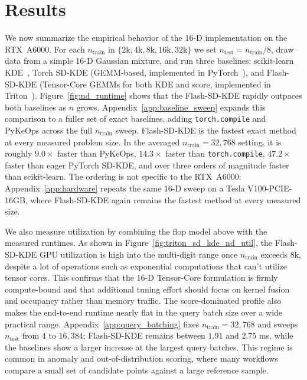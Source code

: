 \section{Results}
\label{sec:results}

We now summarize the empirical behavior of the 16-D implementation on the
RTX~A6000.  For each $n_{\text{train}}$ in $\{2\text{k}, 4\text{k}, 8\text{k}, 16\text{k},
32\text{k}\}$ we set $n_{\text{test}} = n_{\text{train}}/8$, draw data from a
simple 16-D Gaussian mixture, and run three baselines: scikit-learn KDE~\citep{pedregosa2011scikit},
Torch SD-KDE (GEMM-based, implemented in PyTorch~\citep{paszke2019pytorch}), and
Flash-SD-KDE (Tensor-Core GEMMs for both KDE and score, implemented in
Triton~\citep{tillet2019triton}).  Figure~\ref{fig:nd_runtime} shows that the Flash-SD-KDE rapidly
outpaces both baselines as $n$ grows. Appendix~\ref{app:baseline_sweep} expands this comparison to a fuller set of
exact baselines, adding \texttt{torch.compile} and PyKeOps across the full
$n_{\text{train}}$ sweep.  Flash-SD-KDE is the fastest exact method at every
measured problem size.  In the averaged $n_{\text{train}}=32{,}768$ setting, it
is roughly $9.0\times$ faster than PyKeOps, $14.3\times$ faster than
\texttt{torch.compile}, $47.2\times$ faster than eager PyTorch SD-KDE, and over
three orders of magnitude faster than scikit-learn. The ordering is not specific to the RTX~A6000: Appendix~\ref{app:hardware}
repeats the same 16-D sweep on a Tesla V100-PCIE-16GB, where Flash-SD-KDE
again remains the fastest method at every measured size.

We also measure utilization by combining the flop model above with the
measured runtimes.  As shown in Figure~\ref{fig:triton_sd_kde_nd_util}, the Flash-SD-KDE GPU utilization is high into the multi-digit range once
$n_{\text{train}}$ exceeds $8\text{k}$, despite a lot of operations such as exponential computations that can't utilize tensor cores.  This confirms that the 16-D
Tensor-Core formulation is firmly compute-bound and that additional tuning
effort should focus on kernel fusion and occupancy rather than memory traffic. The score-dominated profile also makes the end-to-end runtime nearly flat in
the query batch size over a wide practical range.  Appendix~\ref{app:query_batching}
fixes $n_{\text{train}}=32{,}768$ and sweeps $n_{\text{test}}$ from $4$ to
$16{,}384$; Flash-SD-KDE remains between $1.91$ and $2.75$ ms, while the
baselines show a larger increase at the largest query batches.  This regime is
common in anomaly and out-of-distribution scoring, where many workflows compare
a small set of candidate points against a large reference sample. 




